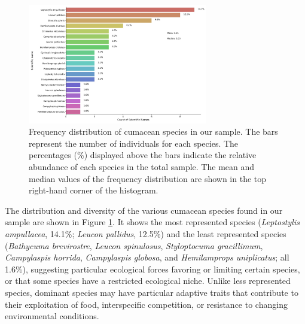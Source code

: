 \begin{figure}[htbp]
    \centering
    \includegraphics[width=0.7\textwidth]{figure2.jpg}
    \caption{Frequency distribution of cumacean species in our sample. The bars represent the number of individuals for each species. The percentages (\%) displayed above the bars indicate the relative abundance of each species in the total sample. The mean and median values of the frequency distribution are shown in the top right-hand corner of the histogram. \label{fig:fig3}}
\end{figure}

The distribution and diversity of the various cumacean species found in our sample are shown in Figure \ref{fig:fig3}. It shows the most represented species (\emph{Leptostylis ampullacea}, 14.1\%; \emph{Leucon pallidus}, 12.5\%) and the least represented species (\emph{Bathycuma brevirostre}, \emph{Leucon spinulosus}, \emph{Styloptocuma gracillimum}, \emph{Campylaspis horrida}, \emph{Campylaspis globosa}, and \emph{Hemilamprops uniplicatus}; all 1.6\%), suggesting particular ecological forces favoring or limiting certain species, or that some species have a restricted ecological niche. Unlike less represented species, dominant species may have particular adaptive traits that contribute to their exploitation of food, interspecific competition, or resistance to changing environmental conditions.

